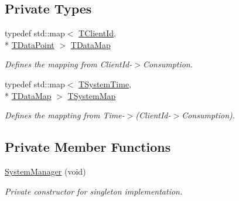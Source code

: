 \subsection*{Private Types}
\begin{DoxyCompactItemize}
\item 
typedef std\-::map$<$ \hyperlink{class_system_manager_af957fc0ff78c4c38085c26ac0d81064e}{T\-Client\-Id}, \\*
\hyperlink{class_system_manager_a177b09f79bd2cef44160fb4d8ea77996}{T\-Data\-Point} $>$ \hyperlink{class_system_manager_ac003793cd03c1af317bf30b11e8c0a5a}{T\-Data\-Map}
\begin{DoxyCompactList}\small\item\em Defines the mapping from Client\-Id-\/$>$Consumption. \end{DoxyCompactList}\item 
typedef std\-::map$<$ \hyperlink{class_system_manager_a9743ff4f23e7d957f5932780d8070099}{T\-System\-Time}, \\*
\hyperlink{class_system_manager_ac003793cd03c1af317bf30b11e8c0a5a}{T\-Data\-Map} $>$ \hyperlink{class_system_manager_aae66953e62823ae14519c7e9b3925864}{T\-System\-Map}
\begin{DoxyCompactList}\small\item\em Defines the mappting from Time-\/$>$(Client\-Id-\/$>$Consumption). \end{DoxyCompactList}\end{DoxyCompactItemize}
\subsection*{Private Member Functions}
\begin{DoxyCompactItemize}
\item 
\hyperlink{class_system_manager_a7654b10e671b56945ff0958781e07a6f}{System\-Manager} (void)
\begin{DoxyCompactList}\small\item\em Private constructor for singleton implementation. \end{DoxyCompactList}\end{DoxyCompactItemize}
